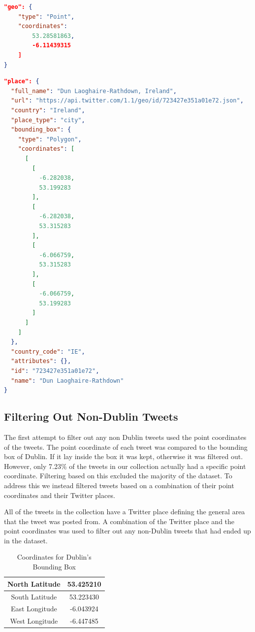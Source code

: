 \begin{lstlisting}[caption={Geo-tagged Tweet with Point Coordinate},
captionpos=b,label=lst:pointjson,language=json,firstnumber=1]
"geo": {
    "type": "Point",
    "coordinates": 
        53.28581863,
        -6.11439315
    ]
}
\end{lstlisting}

\begin{lstlisting}[caption={Geo-tagged Tweet with Twitter Place},captionpos=b,label=lst:placejson,language=json,firstnumber=1]
"place": {
  "full_name": "Dun Laoghaire-Rathdown, Ireland",
  "url": "https://api.twitter.com/1.1/geo/id/723427e351a01e72.json",
  "country": "Ireland",
  "place_type": "city",
  "bounding_box": {
    "type": "Polygon",
    "coordinates": [
      [
        [
          -6.282038,
          53.199283
        ],
        [
          -6.282038,
          53.315283
        ],
        [
          -6.066759,
          53.315283
        ],
        [
          -6.066759,
          53.199283
        ]
      ]
    ]
  },
  "country_code": "IE",
  "attributes": {},
  "id": "723427e351a01e72",
  "name": "Dun Laoghaire-Rathdown"
}
\end{lstlisting}

\subsection*{Filtering Out Non-Dublin Tweets}

The first attempt to filter out any non Dublin tweets used the point coordinates of the tweets. The point coordinate of each tweet was compared to the bounding box of Dublin. If it lay inside the box it was kept, otherwise it was filtered out. However, only 7.23\% of the tweets in our collection actually had a specific point coordinate. Filtering based on this excluded the majority of the dataset. To address this we instead filtered tweets based on a combination of their point coordinates and their Twitter places.

All of the tweets in the collection have a Twitter place defining the general area that the tweet was posted from. A combination of the Twitter place and the point coordinates was used to filter out any non-Dublin tweets that had ended up in the dataset. 

\begin{table}[h!]
\caption{Coordinates for Dublin's Bounding Box}
\label{tab:dublinbb}
\setlength\extrarowheight{5pt}
\begin{tabular}{|c|c|}
\hline
North Latitude  & 53.425210 \\ \hline
South Latitude  & 53.223430 \\ \hline
East Longitude & -6.043924 \\ \hline
West Longitude & -6.447485 \\ \hline
\end{tabular}
\end{table}

